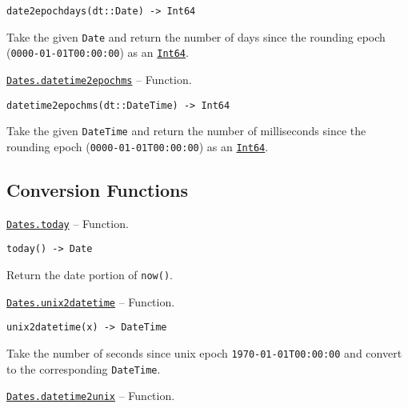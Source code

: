 \begin{adjustwidth}{2em}{0pt}


\begin{verbatim}
date2epochdays(dt::Date) -> Int64
\end{verbatim}

Take the given \texttt{Date} and return the number of days since the rounding epoch (\texttt{0000-01-01T00:00:00}) as an \hyperlink{7720564657383125058}{\texttt{Int64}}.



\end{adjustwidth}
\hypertarget{12248243003394996071}{}
\hyperlink{12248243003394996071}{\texttt{Dates.datetime2epochms}}  -- {Function.}

\begin{adjustwidth}{2em}{0pt}


\begin{verbatim}
datetime2epochms(dt::DateTime) -> Int64
\end{verbatim}

Take the given \texttt{DateTime} and return the number of milliseconds since the rounding epoch (\texttt{0000-01-01T00:00:00}) as an \hyperlink{7720564657383125058}{\texttt{Int64}}.



\end{adjustwidth}

\hypertarget{16263610530566732944}{}


\subsection{Conversion Functions}


\hypertarget{14772120662961874184}{}
\hyperlink{14772120662961874184}{\texttt{Dates.today}}  -- {Function.}

\begin{adjustwidth}{2em}{0pt}


\begin{verbatim}
today() -> Date
\end{verbatim}

Return the date portion of \texttt{now()}.



\end{adjustwidth}
\hypertarget{1873675393210620747}{}
\hyperlink{1873675393210620747}{\texttt{Dates.unix2datetime}}  -- {Function.}

\begin{adjustwidth}{2em}{0pt}


\begin{verbatim}
unix2datetime(x) -> DateTime
\end{verbatim}

Take the number of seconds since unix epoch \texttt{1970-01-01T00:00:00} and convert to the corresponding \texttt{DateTime}.



\end{adjustwidth}
\hypertarget{4964397354460606136}{}
\hyperlink{4964397354460606136}{\texttt{Dates.datetime2unix}}  -- {Function.}

